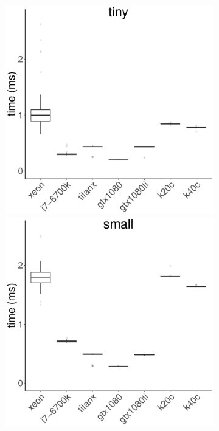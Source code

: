 \documentclass[../document.tex]{subfiles}
\begin{document}
\begin{figure}
	\begin{subfigure}{0.09\textwidth} \label{fig:time-dwt} \vspace{5mm}\end{subfigure}
	\begin{subfigure}{0.9\textwidth}
		\includegraphics[width=\plotwidth]{figures/time-results/generate_dwt_tiny_boxplot-1}
		\includegraphics[width=\plotwidth]{figures/time-results/generate_dwt_small_boxplot-1}

\end{subfigure}
\end{figure}
\end{document}
